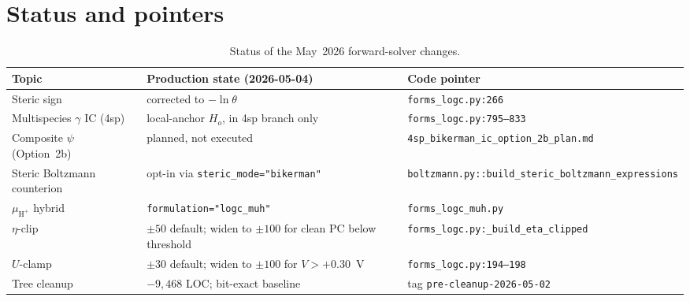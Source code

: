 \documentclass[11pt]{article}
\newcommand{\Hp}{\text{H}^+}
\begin{document}
\section{Status and pointers}
\label{sec:status}

\begin{table}[ht]
\centering
\small
\begin{tabular}{p{4.7cm}p{4.7cm}p{4cm}}
\toprule
Topic & Production state (2026-05-04) & Code pointer \\
\midrule
Steric sign & corrected to $-\ln\theta$ & \texttt{forms\_logc.py:266} \\
Multispecies $\gamma$ IC (4sp) & local-anchor $H_o$, in 4sp branch only & \texttt{forms\_logc.py:795--833} \\
Composite $\psi$ (Option~2b) & planned, not executed & \texttt{4sp\_bikerman\_ic\_option\_2b\_plan.md} \\
Steric Boltzmann counterion & opt-in via \texttt{steric\_mode="bikerman"} & \texttt{boltzmann.py::build\_steric\_boltzmann\_expressions} \\
$\mu_{\Hp}$ hybrid & \texttt{formulation="logc\_muh"} & \texttt{forms\_logc\_muh.py} \\
$\eta$-clip & $\pm 50$ default; widen to $\pm 100$ for clean PC below threshold & \texttt{forms\_logc.py:\_build\_eta\_clipped} \\
$U$-clamp & $\pm 30$ default; widen to $\pm 100$ for $V>+0.30$~V & \texttt{forms\_logc.py:194--198} \\
Tree cleanup & $-9{,}468$ LOC; bit-exact baseline & tag \texttt{pre-cleanup-2026-05-02} \\
\bottomrule
\end{tabular}
\caption{Status of the May~2026 forward-solver changes.}
\end{table}
\end{document}
